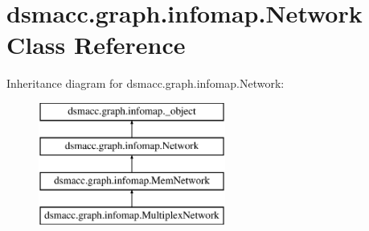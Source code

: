 \hypertarget{classdsmacc_1_1graph_1_1infomap_1_1Network}{}\section{dsmacc.\+graph.\+infomap.\+Network Class Reference}
\label{classdsmacc_1_1graph_1_1infomap_1_1Network}
Inheritance diagram for dsmacc.\+graph.\+infomap.\+Network\+:\begin{figure}[H]
\begin{center}
\leavevmode
\includegraphics[height=4.000000cm]{classdsmacc_1_1graph_1_1infomap_1_1Network}
\end{center}
\end{figure}

